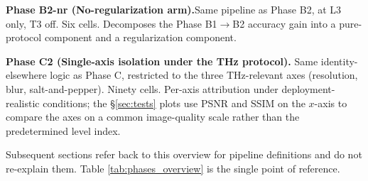 \textbf{Phase B2-nr (No-regularization arm).}\quad Same pipeline as
Phase B2, at L3 only, T3 off. Six cells. Decomposes the
Phase B1$\to$B2 accuracy gain into a pure-protocol component and a
regularization component.

\textbf{Phase C2 (Single-axis isolation under the THz protocol).}\quad
Same identity-elsewhere logic as Phase C, restricted to the three
THz-relevant axes (resolution, blur, salt-and-pepper). Ninety cells.
Per-axis attribution under deployment-realistic conditions; the
\S\ref{sec:tests} plots use PSNR and SSIM on the $x$-axis to compare the
axes on a common image-quality scale rather than the predetermined level
index.



Subsequent sections refer back to this overview for pipeline
definitions and do not re-explain them. Table \ref{tab:phases_overview}
is the single point of reference.
